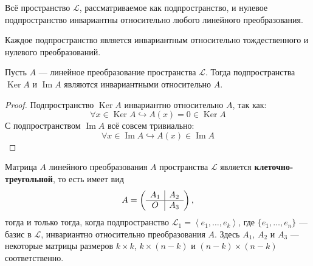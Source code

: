 \documentclass[11pt]{article}
\DeclareMathOperator{\Imm}{Im}
\DeclareMathOperator{\Ker}{Ker}
\begin{document}
\begin{remark}
    Всё пространство $\mathcal{L}$, рассматриваемое как подпространство, и нулевое подпространство инвариантны относительно любого линейного преобразования.
\end{remark}

\begin{remark}
    Каждое подпространство является инвариантным относительно тождественного и нулевого преобразований.
\end{remark}

\begin{lemma}
    Пусть $A$ --- линейное преобразование пространства $\mathcal{L}$. Тогда подпространства $\Ker A$ и $\Imm A$ являются инвариантными относительно $A$.
\end{lemma}

\begin{proof}
    Подпространство $\Ker A$ инвариантно относительно $A$, так как:
    \[\forall x \in \Ker A \hookrightarrow A(x) = 0 \in \Ker A\]
    С подпространством $\Imm A$ всё совсем тривиально:
    \[\forall x \in \Imm A \hookrightarrow A(x) \in \Imm A\]
\end{proof}

\begin{theorem}
    Матрица $A$ линейного преобразования $A$ пространства $\mathcal{L}$ является \textbf{клеточно-треугольной}, то есть имеет вид
    \begin{equation*}
        A = 
        \left(\begin{array}{ c | c }
            A_1 & A_2 \\
            \hline
            O & A_3
        \end{array}\right)
        ,
    \end{equation*}
    тогда и только тогда, когда подпространство $\mathcal{L}_1 = \left\langle e_1, \ldots, e_k \right\rangle$, где $\{e_1, \ldots, e_n\}$ --- базис в $\mathcal{L}$, инвариантно относительно преобразования $A$. Здесь $A_1$, $A_2$ и $A_3$ --- некоторые матрицы размеров $k \times k$, $k \times (n - k)$ и $(n - k) \times (n - k)$ соответственно.
\end{theorem}
\end{document}
